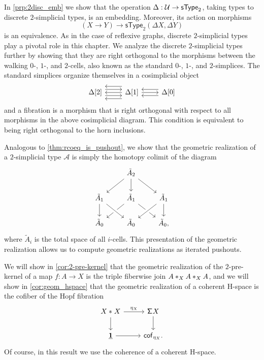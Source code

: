 In \cref{prp:2disc_emb} we show that the operation $\Delta:\UU\to \mathsf{sType}_2$, taking types to discrete $2$-simplicial types, is an embedding. Moreover, its action on morphisms
\begin{equation*}
(X\to Y) \to \mathsf{sType}_2(\Delta X,\Delta Y)
\end{equation*}
is an equivalence. As in the case of reflexive graphs, discrete $2$-simplicial types play a pivotal role in this chapter. We analyze the discrete $2$-simplicial types further by showing that they are right orthogonal to the morphisms between the walking $0$-, $1$-, and $2$-cells, also known as the standard $0$-, $1$-, and $2$-simplices. The standard simplices organize themselves in a cosimplicial object
\begin{equation*}
\begin{tikzcd}
\Delta[2] \arrow[r,yshift=1ex] \arrow[r,yshift=-1ex] & \Delta[1] \arrow[l,yshift=2ex] \arrow[l] \arrow[l,yshift=-2ex] \arrow[r] & \Delta[0] \arrow[l,yshift=1ex] \arrow[l,yshift=-1ex]
\end{tikzcd}
\end{equation*}
and a fibration is a morphism that is right orthogonal with respect to all morphisms in the above cosimplicial diagram. This condition is equivalent to being right orthogonal to the horn inclusions.

Analogous to \cref{thm:rcoeq_is_pushout}, we show that the geometric realization of a $2$-simplicial type $\mathcal{A}$ is simply the homotopy colimit of the diagram
\begin{equation*}
\begin{tikzcd}
& \tilde{A}_2 \arrow[dl] \arrow[d] \arrow[dr] \\
\tilde{A}_1 \arrow[d] & \tilde{A}_1 \arrow[dl] \arrow[dr] & \tilde{A}_1 \arrow[dl,crossing over] \arrow[d] \\
\tilde{A}_0 & \tilde{A}_0 \arrow[from=ul,crossing over] & \tilde{A}_0,
\end{tikzcd}
\end{equation*}
where $\tilde{A}_i$ is the total space of all $i$-cells.
This presentation of the geometric realization allows us to compute geometric realizations as iterated pushouts.

We will show in \cref{cor:2-pre-kernel} that the geometric realization of the $2$-pre-kernel of a map $f:A\to X$ is the triple fiberwise join $\join[X]{A}{\join[X]{A}{A}}$, and we will show in \cref{cor:geom_hspace} that the geometric realization of a coherent H-space is the cofiber of the Hopf fibration
\begin{equation*}
\begin{tikzcd}
\join{X}{X} \arrow[r,"\eta_X"] \arrow[d] & \susp X \arrow[d] \\
\unit \arrow[r] & \mathsf{cof}_{\eta_X}.
\end{tikzcd}
\end{equation*}
Of course, in this result we use the coherence of a coherent H-space.

